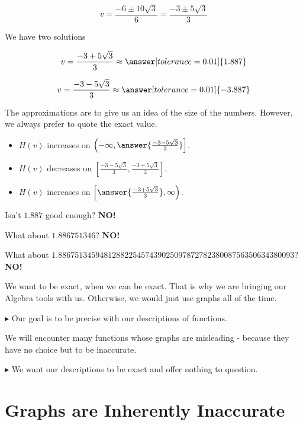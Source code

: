 \documentclass{ximera}
\begin{document}
\begin{example}
\[  v = \frac{-6 \pm 10\sqrt{3}}{6}  =  \frac{-3 \pm 5\sqrt{3}}{3} \]



We have two solutions


\[  v =  \frac{-3 + 5\sqrt{3}}{3}  \approx  \answer[tolerance=0.01]{1.887} \]


\[  v =  \frac{-3 - 5\sqrt{3}}{3} \approx   \answer[tolerance=0.01]{-3.887} \]




The approximations are to give us an idea of the size of the numbers. However, we always prefer to quote the exact value.

\begin{itemize}
\item $H(v)$ increases on $\left( -\infty, \answer{\frac{-3 - 5\sqrt{3}}{3}}   \right]$.
\item $H(v)$ decreases on $\left[ \frac{-3 - 5\sqrt{3}}{3} , \frac{-3 + 5\sqrt{3}}{3}   \right]$.
\item $H(v)$ increases on $\left[ \answer{\frac{-3 + 5\sqrt{3}}{3}}, \infty  \right)$.
\end{itemize}



\end{example}





Isn't $1.887$ good enough?  \textbf{NO!}  

What about $1.886751346$? \textbf{NO!}  

What about $1.886751345948128822545743902509787278238008756350634380093$? \textbf{NO!}  

We want to be exact, when we can be exact.  That is why we are bringing our Algebra tools with us.  Otherwise, we would just use graphs all of the time.

\textbf{\textcolor{red!90!darkgray}{$\blacktriangleright$}} Our goal is to be precise with our descriptions of functions.


We will encounter many functions whose graphs are misleading - because they have no choice but to be inaccurate.

\textbf{\textcolor{red!90!darkgray}{$\blacktriangleright$}} We want our descriptions to be exact and offer nothing to question.









\section*{Graphs are Inherently Inaccurate}
\end{document}
